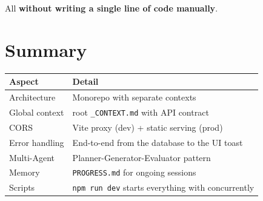 All \textbf{without writing a single line of code manually}.

\section*{Summary}

\begin{center}
\begin{tabularx}{\textwidth}{l X}
\toprule
\textbf{Aspect} & \textbf{Detail} \\
\midrule
Architecture & Monorepo with separate contexts \\
Global context & root \texttt{\_CONTEXT.md} with API contract \\
CORS & Vite proxy (dev) + static serving (prod) \\
Error handling & End-to-end from the database to the UI toast \\
Multi-Agent & Planner-Generator-Evaluator pattern \\
Memory & \texttt{PROGRESS.md} for ongoing sessions \\
Scripts & \texttt{npm run dev} starts everything with concurrently \\
\bottomrule
\end{tabularx}
\end{center}
